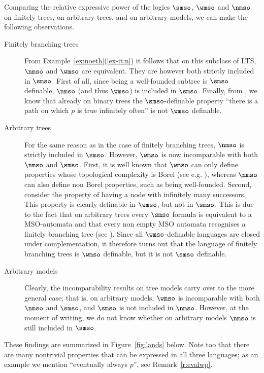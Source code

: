 Comparing the relative expressive power of the logics $\smso$, $\wmso$ and 
$\nmso$ on finitely trees, on arbitrary trees, and on arbitrary models, we can
make the following observations.
\begin{description}
\item[Finitely branching trees] 
From Example~\ref{ex:noeth}(\ref{ex-it:n}) it follows that on this subclass of
LTS, $\nmso$ and $\wmso$ are equivalent. 
They are however both strictly included in $\smso$. 
First of all,  since being a well-founded subtree is $\smso$ definable, $\nmso$ 
(and thus $\wmso$) is included in $\smso$.
Finally, from \cite{Rab70}, we know that already on binary trees the 
$\smso$-definable property ``there is a path on which $p$ is true infinitely 
often'' is not $\wmso$ definable.  
\item[Arbitrary trees] 
For the same reason as in the case of finitely branching trees, $\nmso$ is 
strictly included in $\smso$. 
However, $\wmso$ is now incomparable with both $\nmso$  and $\smso$. 
First,  it is well known that $\wmso$ can only define properties whose 
topological complexity is Borel (see e.g. \cite{CateF11}), whereas $\nmso$ can 
also define non Borel properties, such as being well-founded. 
Second, consider the property of having a node with infinitely many successors. 
This property is clearly definable in $\wmso$, but not in $\smso$. 
This is due to the fact that on arbitrary trees every $\smso$ formula is
equivalent to a MSO-automata and that every non empty MSO automata recognises 
a finitely branching tree (see \cite{Walukiewicz96}). 
Since all $\wmso$-definable languages are closed under complementation, it 
therefore turns out that the language of finitely branching trees is $\wmso$ 
definable, but it is not $\smso$ definable. 
\item[Arbitrary models] 
Clearly, the incomparability results on tree models carry over to the 
more general case; that is, on arbitrary models, $\wmso$ is incomparable with 
both $\nmso$ and $\smso$, and $\smso$ is not included in $\nmso$.
However, at the moment of writing, we do not know whether on arbitrary models
$\nmso$ is still included in $\smso$. 
\end{description}
These findings are summarized in Figure~\ref{fig:lands} below.
Note too that there are many nontrivial properties that can be expressed in all
three languages; as an example we mention ``eventually always $p$'', 
see Remark~\ref{r:evalwp}.
